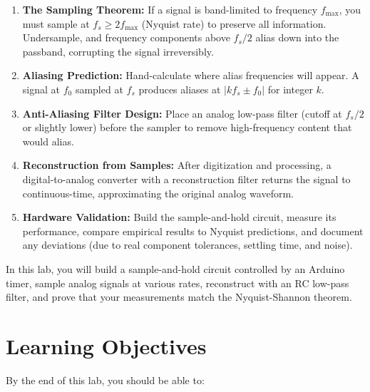 \documentclass[11pt,letterpaper]{article}
\begin{document}
\begin{enumerate}
    \item \textbf{The Sampling Theorem:} If a signal is band-limited to frequency $f_{\text{max}}$, you must sample at $f_s \geq 2 f_{\text{max}}$ (Nyquist rate) to preserve all information. Undersample, and frequency components above $f_s / 2$ alias down into the passband, corrupting the signal irreversibly.

    \item \textbf{Aliasing Prediction:} Hand-calculate where alias frequencies will appear. A signal at $f_0$ sampled at $f_s$ produces aliases at $|k f_s \pm f_0|$ for integer $k$.

    \item \textbf{Anti-Aliasing Filter Design:} Place an analog low-pass filter (cutoff at $f_s / 2$ or slightly lower) before the sampler to remove high-frequency content that would alias.

    \item \textbf{Reconstruction from Samples:} After digitization and processing, a digital-to-analog converter with a reconstruction filter returns the signal to continuous-time, approximating the original analog waveform.

    \item \textbf{Hardware Validation:} Build the sample-and-hold circuit, measure its performance, compare empirical results to Nyquist predictions, and document any deviations (due to real component tolerances, settling time, and noise).
\end{enumerate}

\noindent
In this lab, you will build a sample-and-hold circuit controlled by an Arduino timer, sample analog signals at various rates, reconstruct with an RC low-pass filter, and prove that your measurements match the Nyquist-Shannon theorem.

\clearpage

\section{Learning Objectives}

By the end of this lab, you should be able to:
\end{document}
